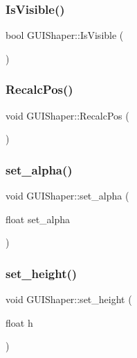 \hypertarget{class_g_u_i_shaper_ae30e61d8b953bfaff7c9e46cdbf57c2f}{}\label{class_g_u_i_shaper_ae30e61d8b953bfaff7c9e46cdbf57c2f} 
\subsubsection{\texorpdfstring{Is\+Visible()}{IsVisible()}}
{\footnotesize\ttfamily bool G\+U\+I\+Shaper\+::\+Is\+Visible (\begin{DoxyParamCaption}{ }\end{DoxyParamCaption})}

\hypertarget{class_g_u_i_shaper_aaccf22e773d429069513ae89d790e83e}{}\label{class_g_u_i_shaper_aaccf22e773d429069513ae89d790e83e} 
\subsubsection{\texorpdfstring{Recalc\+Pos()}{RecalcPos()}}
{\footnotesize\ttfamily void G\+U\+I\+Shaper\+::\+Recalc\+Pos (\begin{DoxyParamCaption}{ }\end{DoxyParamCaption})}

\hypertarget{class_g_u_i_shaper_a6fe6c625c499dbf0fd006c435a230381}{}\label{class_g_u_i_shaper_a6fe6c625c499dbf0fd006c435a230381} 
\subsubsection{\texorpdfstring{set\+\_\+alpha()}{set\_alpha()}}
{\footnotesize\ttfamily void G\+U\+I\+Shaper\+::set\+\_\+alpha (\begin{DoxyParamCaption}\item[{float}]{set\+\_\+alpha }\end{DoxyParamCaption})}

\hypertarget{class_g_u_i_shaper_af01891e6832d9b2ddbd347d74b1a5fce}{}\label{class_g_u_i_shaper_af01891e6832d9b2ddbd347d74b1a5fce} 
\subsubsection{\texorpdfstring{set\+\_\+height()}{set\_height()}}
{\footnotesize\ttfamily void G\+U\+I\+Shaper\+::set\+\_\+height (\begin{DoxyParamCaption}\item[{float}]{h }\end{DoxyParamCaption})}

